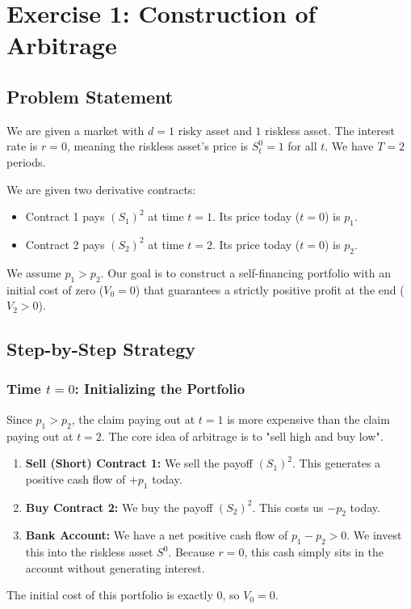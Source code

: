 \section{Exercise 1: Construction of Arbitrage}

\subsection{Problem Statement}
We are given a market with $d=1$ risky asset and $1$ riskless asset. The interest rate is $r=0$, meaning the riskless asset's price is $S_t^0 = 1$ for all $t$. We have $T=2$ periods. 

We are given two derivative contracts:
\begin{itemize}
    \item Contract 1 pays $(S_1)^2$ at time $t=1$. Its price today ($t=0$) is $p_1$.
    \item Contract 2 pays $(S_2)^2$ at time $t=2$. Its price today ($t=0$) is $p_2$.
\end{itemize}
We assume $p_1 > p_2$. Our goal is to construct a self-financing portfolio with an initial cost of zero ($V_0 = 0$) that guarantees a strictly positive profit at the end ($V_2 > 0$).

\subsection{Step-by-Step Strategy}

\subsubsection*{Time $t=0$: Initializing the Portfolio}
Since $p_1 > p_2$, the claim paying out at $t=1$ is more expensive than the claim paying out at $t=2$. The core idea of arbitrage is to "sell high and buy low".
\begin{enumerate}
    \item \textbf{Sell (Short) Contract 1:} We sell the payoff $(S_1)^2$. This generates a positive cash flow of $+p_1$ today.
    \item \textbf{Buy Contract 2:} We buy the payoff $(S_2)^2$. This costs us $-p_2$ today.
    \item \textbf{Bank Account:} We have a net positive cash flow of $p_1 - p_2 > 0$. We invest this into the riskless asset $S^0$. Because $r=0$, this cash simply sits in the account without generating interest.
\end{enumerate}
The initial cost of this portfolio is exactly $0$, so $V_0 = 0$.


